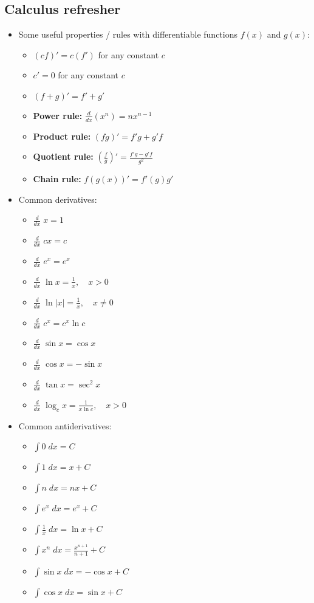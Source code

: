 \documentclass{article}
\begin{document}
\begin{multicols*}{2}
\subsection{Calculus refresher}
\begin{itemize}
    \item Some useful properties / rules with differentiable functions $f(x)$ and $g(x)$:
    \begin{itemize}
        \item $(cf)' = c(f')$ for any constant $c$
        \item $c' = 0$ for any constant $c$
        \item $(f+g)' = f' + g'$
        \item \textbf{Power rule:} $\frac{d}{dx}(x^n) = nx^{n-1}$
        \item \textbf{Product rule:} $(fg)' = f'g + g'f$
        \item \textbf{Quotient rule:} $(\frac{f}{g})' = \frac{f'g - g'f}{g^2}$
        \item \textbf{Chain rule:} $f(g(x))' = f'(g)g'$
    \end{itemize}
    \item Common derivatives:
    \begin{itemize}
        \item $\frac{d}{dx}\; x = 1$
        \item $\frac{d}{dx}\; cx = c$
        \item $\frac{d}{dx}\; e^x = e^x$
        \item $\frac{d}{dx}\; \ln{x} = \frac{1}{x}, \quad x > 0$
        \item $\frac{d}{dx}\; \ln{\lvert x \rvert}= \frac{1}{x}, \quad x \neq 0$
        \item $\frac{d}{dx}\; c^x = c^x \ln{c}$
        \item $\frac{d}{dx}\; \sin{x} = \cos{x}$
        \item $\frac{d}{dx}\; \cos{x} = -\sin{x}$
        \item $\frac{d}{dx}\; \tan{x} = \sec^2{x}$
        \item $\frac{d}{dx}\; \log_c{x}=\frac{1}{x\ln{c}}, \quad x > 0 $
    \end{itemize}
    \item Common antiderivatives:
    \begin{itemize}
        \item $\int 0 \;dx = C$
        \item $\int 1 \;dx = x + C$
        \item $\int n \;dx = nx + C$
        \item $\int e^x \;dx = e^x + C$
        \item $\int \frac{1}{x} \;dx = \ln{x} +C$
        \item $\int x^n \;dx = \frac{x^{n+1}}{n+1} + C$
        \item $\int \sin{x} \; dx = -\cos{x} + C$
        \item $\int \cos{x} \; dx = \sin{x} + C$
    \end{itemize}
\end{itemize}


\end{multicols*}
\end{document}
